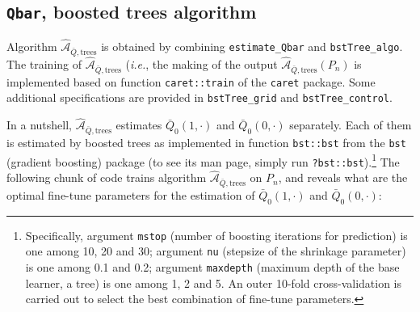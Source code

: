 \documentclass[11pt,openright,twoside]{book}
\newcommand{\Algo}{\widehat{\mathcal{A}}}
\newcommand{\Qbar}{\bar{Q}}
\theoremstyle{definition}
\theoremstyle{definition}
\theoremstyle{definition}
\theoremstyle{remark}
\begin{document}
\hypertarget{boosted-trees}{%
\subsection{\texorpdfstring{\texttt{Qbar}, boosted trees algorithm}{Qbar, boosted trees algorithm}}\label{boosted-trees}}

Algorithm \(\Algo_{\Qbar,\text{trees}}\) is obtained by combining
\texttt{estimate\_Qbar} and \texttt{bstTree\_algo}. The training of
\(\Algo_{\Qbar,\text{trees}}\) (\emph{i.e.}, the making of the output
\(\Algo_{\Qbar,\text{trees}} (P_{n})\) is implemented based on function
\texttt{caret::train} of the \texttt{caret} package. Some additional specifications are
provided in \texttt{bstTree\_grid} and \texttt{bstTree\_control}.

In a nutshell, \(\Algo_{\Qbar,\text{trees}}\) estimates \(\Qbar_{0}(1,\cdot)\) and
\(\Qbar_{0}(0,\cdot)\) separately. Each of them is estimated by boosted trees
as implemented in function \texttt{bst::bst} from the \texttt{bst} (gradient boosting)
package (to see its man page, simply run \texttt{?bst::bst}).\footnote{Specifically, argument
  \texttt{mstop} (number of boosting iterations for prediction) is one among 10, 20 and
  30; argument \texttt{nu} (stepsize of the shrinkage parameter) is one among 0.1 and
  0.2; argument \texttt{maxdepth} (maximum depth of the base learner, a tree) is one
  among 1, 2 and 5. An outer 10-fold cross-validation is carried out to select
  the best combination of fine-tune parameters.} The following chunk of code
trains algorithm \(\Algo_{\Qbar,\text{trees}}\) on \(P_{n}\), and reveals what are
the optimal fine-tune parameters for the estimation of \(\Qbar_{0}(1,\cdot)\)
and \(\Qbar_{0}(0,\cdot)\):
\end{document}
